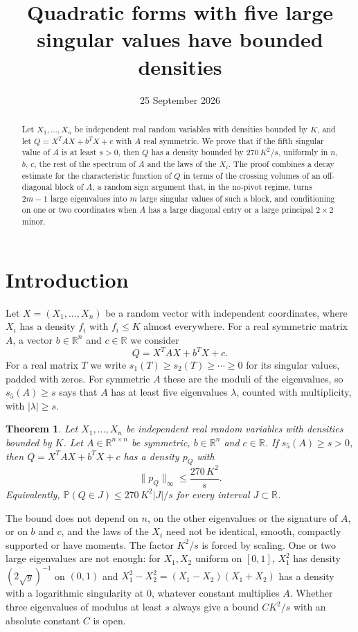 \documentclass[11pt]{amsart}
\title{Quadratic forms with five large singular values have bounded densities}
\date{25 September 2026}
\numberwithin{equation}{section}
\newtheorem{theorem}{Theorem}[section]
\theoremstyle{definition}
\theoremstyle{remark}
\newcommand{\R}{\mathbb R}
\newcommand{\PP}{\mathbb P}
\newcommand{\1}{\mathbf 1}
\newcommand{\norm}[1]{\lVert #1\rVert}
\newcommand{\abs}[1]{\lvert #1\rvert}
\begin{document}
\begin{abstract}
Let $X_1,\dots,X_n$ be independent real random variables with densities bounded by $K$, and let $Q=X^{T}AX+b^{T}X+c$ with $A$ real symmetric. We prove that if the fifth singular value of $A$ is at least $s>0$, then $Q$ has a density bounded by $270\,K^2/s$, uniformly in $n$, $b$, $c$, the rest of the spectrum of $A$ and the laws of the $X_i$. The proof combines a decay estimate for the characteristic function of $Q$ in terms of the crossing volumes of an off-diagonal block of $A$, a random sign argument that, in the no-pivot regime, turns $2m-1$ large eigenvalues into $m$ large singular values of such a block, and conditioning on one or two coordinates when $A$ has a large diagonal entry or a large principal $2\times2$ minor.
\end{abstract}

\maketitle

\section{Introduction}\label{sec:intro}

Let $X=(X_1,\dots,X_n)$ be a random vector with independent coordinates, where $X_i$ has a density $f_i$ with $f_i\le K$ almost everywhere. For a real symmetric matrix $A$, a vector $b\in\R^n$ and $c\in\R$ we consider
\[
Q=X^{T}AX+b^{T}X+c .
\]
For a real matrix $T$ we write $s_1(T)\ge s_2(T)\ge\cdots\ge0$ for its singular values, padded with zeros. For symmetric $A$ these are the moduli of the eigenvalues, so $s_5(A)\ge s$ says that $A$ has at least five eigenvalues $\lambda$, counted with multiplicity, with $\abs\lambda\ge s$.

\begin{theorem}\label{thm:main}
Let $X_1,\dots,X_n$ be independent real random variables with densities bounded by $K$. Let $A\in\R^{n\times n}$ be symmetric, $b\in\R^n$ and $c\in\R$. If $s_5(A)\ge s>0$, then $Q=X^TAX+b^TX+c$ has a density $p_Q$ with
\[
\norm{p_Q}_\infty\le \frac{270\,K^2}{s}.
\]
Equivalently, $\PP(Q\in J)\le 270\,K^2\abs J/s$ for every interval $J\subset\R$.
\end{theorem}

The bound does not depend on $n$, on the other eigenvalues or the signature of $A$, or on $b$ and $c$, and the laws of the $X_i$ need not be identical, smooth, compactly supported or have moments. The factor $K^2/s$ is forced by scaling. One or two large eigenvalues are not enough: for $X_1,X_2$ uniform on $[0,1]$, $X_1^2$ has density $(2\sqrt y)^{-1}$ on $(0,1)$ and $X_1^2-X_2^2=(X_1-X_2)(X_1+X_2)$ has a density with a logarithmic singularity at $0$, whatever constant multiplies $A$. Whether three eigenvalues of modulus at least $s$ always give a bound $CK^2/s$ with an absolute constant $C$ is open.
\end{document}
